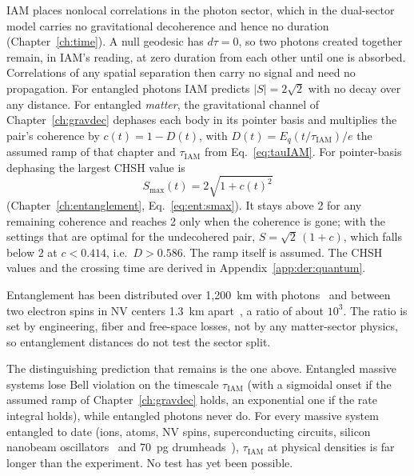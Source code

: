 IAM places nonlocal correlations in the photon sector, which in the dual-sector model carries no gravitational
decoherence and hence no duration (Chapter~\ref{ch:time}). A null geodesic has $d\tau=0$, so
two photons created together remain, in IAM's reading, at zero duration from each other
until one is absorbed. Correlations of any spatial separation then carry no signal and need
no propagation. \interp{} For entangled photons IAM predicts $|S|=2\sqrt2$ with no decay over any
distance. \prediction{} For entangled \emph{matter}, the gravitational channel of Chapter~\ref{ch:gravdec} dephases each body in its pointer basis and
multiplies the pair's coherence by $c(t)=1-D(t)$, with $D(t)=E_q(t/\tau_{\mathrm{IAM}})/e$ the assumed ramp of that chapter and
$\tau_{\mathrm{IAM}}$ from Eq.~\eqref{eq:tauIAM}. For pointer-basis dephasing the largest CHSH value is
\begin{equation}
 S_{\max}(t)=2\sqrt{1+c(t)^2}
\end{equation}
(Chapter~\ref{ch:entanglement}, Eq.~\eqref{eq:ent:smax}). \derived{} It stays above 2 for any remaining coherence and reaches 2 only when
the coherence is gone; with the settings that are optimal for the undecohered pair, $S=\sqrt2\,(1+c)$, which falls below 2 at $c<0.414$,
i.e.\ $D>0.586$. \calc{} The ramp itself is assumed. \conjecture
The CHSH values and the crossing time are derived in Appendix~\ref{app:der:quantum}.

\begin{checkbox}[title={Independent check: what entanglement distances show}]
Entanglement has been distributed over 1{,}200~km with photons~\cite{Yin2017} and between two
electron spins in NV centers 1.3~km apart~\cite{Hensen2015}, a ratio of about $10^3$. The
ratio is set by engineering, fiber and free-space losses, not by any matter-sector physics, so
entanglement distances do not test the sector split. \observed

The distinguishing prediction that remains is the one above. Entangled massive systems lose
Bell violation on the timescale $\tau_{\mathrm{IAM}}$ (with a sigmoidal onset if the assumed ramp
of Chapter~\ref{ch:gravdec} holds, an exponential one if the rate integral holds), while
entangled photons never do. \prediction{} For every massive system entangled to date (ions,
atoms, NV spins, superconducting circuits, silicon nanobeam oscillators~\cite{Riedinger2018} and
70~pg drumheads~\cite{Kotler2021}), $\tau_{\mathrm{IAM}}$ at physical densities is far
longer than the experiment. No test has yet been possible.
\end{checkbox}

